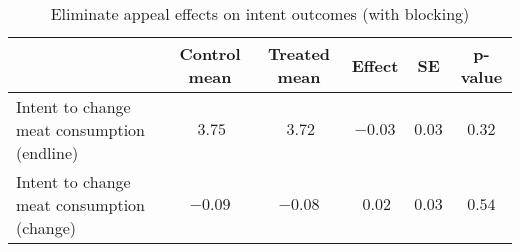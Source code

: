\begin{table*}[ht]
\caption{Eliminate appeal effects on intent outcomes (with blocking)\label{round}} 
\begin{center}
\begin{tabular}{lccccc}
\hline\hline
\multicolumn{1}{l}{}&\multicolumn{1}{c}{Control mean}&\multicolumn{1}{c}{Treated mean}&\multicolumn{1}{c}{Effect}&\multicolumn{1}{c}{SE}&\multicolumn{1}{c}{p-value}\tabularnewline
\hline
Intent to change meat consumption (endline)&$~3.75$&$~3.72$&$-0.03$&$0.03$&$0.32$\tabularnewline
Intent to change meat consumption (change)&$-0.09$&$-0.08$&$~0.02$&$0.03$&$0.54$\tabularnewline
\hline
\end{tabular}\end{center}

\end{table*}
